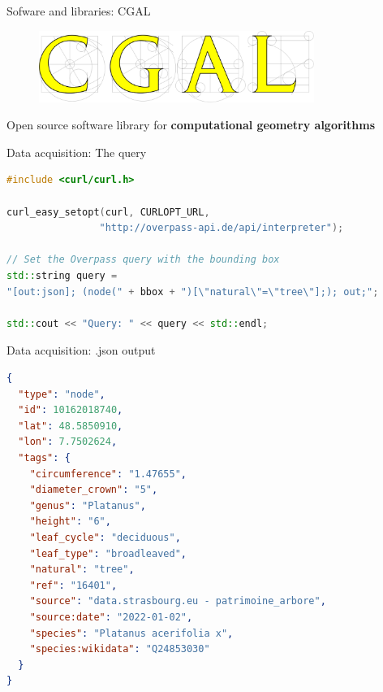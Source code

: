 \documentclass[10pt]{beamer}
\begin{document}
\begin{frame}{Sofware and libraries: CGAL}
  \Large
  \begin{figure}[H]
      \centering
      \includegraphics[width=0.8\textwidth]{images/cgal_logo.png}
  \end{figure}
  \begin{center}
    \Large Open source software library for \textbf{computational geometry algorithms}
  \end{center}
\end{frame}

\begin{frame}[fragile]{Data acquisition: The query}
  \begin{lstlisting}[language=C++]
#include <curl/curl.h>

curl_easy_setopt(curl, CURLOPT_URL,
                "http://overpass-api.de/api/interpreter");

// Set the Overpass query with the bounding box
std::string query =
"[out:json]; (node(" + bbox + ")[\"natural\"=\"tree\"];); out;";

std::cout << "Query: " << query << std::endl;
  \end{lstlisting}
\end{frame}


\begin{frame}[fragile]{Data acquisition: .json output}
\begin{lstlisting}[language=json]
{
  "type": "node",
  "id": 10162018740,
  "lat": 48.5850910,
  "lon": 7.7502624,
  "tags": {
    "circumference": "1.47655",
    "diameter_crown": "5",
    "genus": "Platanus",
    "height": "6",
    "leaf_cycle": "deciduous",
    "leaf_type": "broadleaved",
    "natural": "tree",
    "ref": "16401",
    "source": "data.strasbourg.eu - patrimoine_arbore",
    "source:date": "2022-01-02",
    "species": "Platanus acerifolia x",
    "species:wikidata": "Q24853030"
  }
}
\end{lstlisting}
\end{frame}
\end{document}
